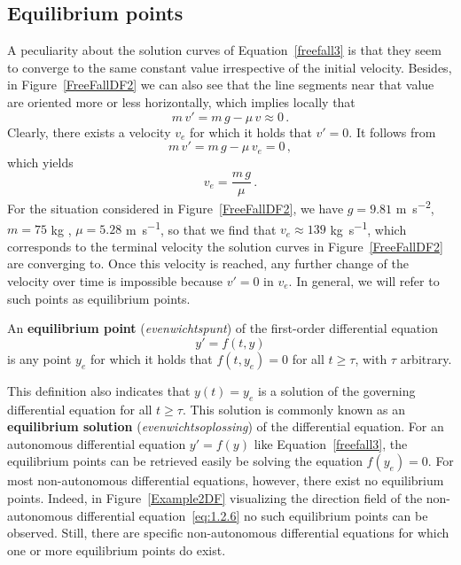 \subsection{Equilibrium points}
\label{equipoints}
A peculiarity about the solution curves of Equation~\eqref{freefall3} is that they seem to converge to the same constant value irrespective of the initial velocity. Besides, in Figure~\ref{FreeFallDF2} we can also see that the line segments near that value are oriented more or less horizontally, which implies locally that
$$
m\,v'=m\,g-\mu\,v\approx0\,.
$$
Clearly, there exists a velocity $v_e$ for which it holds that $v'=0$. It follows from
$$
m\,v'=m\,g-\mu\,v_e=0\,,
$$
which yields
$$
v_e=\dfrac{m\,g}{\mu}\,. 
$$
For the situation considered in Figure~\ref{FreeFallDF2}, we have $g=9.81$ \si{m.s^{-2}}, $m=75$ \si{kg} , $\mu=5.28$ \si{m.s^{-1}}, so that we find that $v_e\approx139$ \si{kg.s^{-1}}, which corresponds to the terminal velocity the solution curves in Figure~\ref{FreeFallDF2} are converging to. Once this velocity is reached, any further change of the velocity over time is impossible because $v'=0$ in $v_e$.  In general, we will refer to such points as equilibrium points.

\begin{definition} 
An \textbf{equilibrium point} (\textit{evenwichtspunt}) of the first-order differential equation
$$
y'=f\left(t,y\right)
$$
is any point $y_e$ for which it holds that $f\left(t,y_e\right)=0$ for all $t\geq\tau$, with $\tau$ arbitrary.
\end{definition}

This definition also indicates that $y(t)=y_e$ is a solution of the governing differential equation for all $t\geq\tau$. This solution is commonly known as an \textbf{equilibrium solution} (\textit{evenwichtsoplossing}) of the differential equation.
For an autonomous differential equation $y'=f(y)$ like Equation~\eqref{freefall3}, the equilibrium points can be retrieved easily be solving the equation $f(y_e)=0$. For most non-autonomous differential equations, however, there exist no equilibrium points. Indeed, in Figure~\ref{Example2DF} visualizing the direction field of the non-autonomous differential equation~\eqref{eq:1.2.6} no such equilibrium points can be observed. Still, there are specific non-autonomous differential equations for which one or more equilibrium points do exist.

